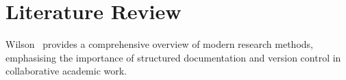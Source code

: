 \section{Literature Review}
\label{sec:literature}

\lipsum[2-3]

Wilson~\cite{wilson2022} provides a comprehensive overview of modern research methods,
emphasising the importance of structured documentation and version control in collaborative
academic work.
